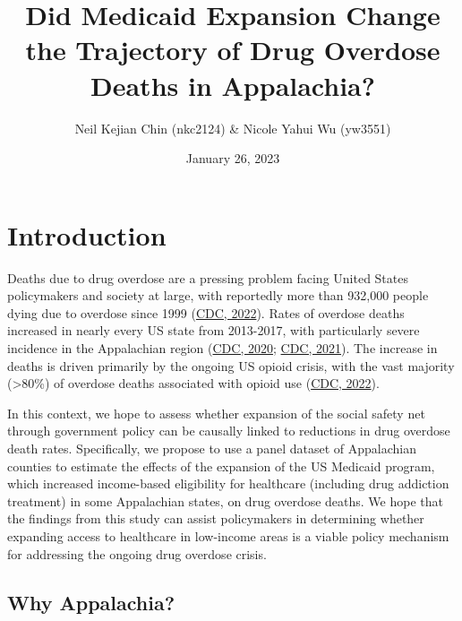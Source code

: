 \documentclass[
  11pt,
]{article}
\title{Did Medicaid Expansion Change the Trajectory of Drug Overdose
Deaths in Appalachia?}
\author{Neil Kejian Chin (nkc2124) \& Nicole Yahui Wu (yw3551)}
\date{January 26, 2023}
\begin{document}
\maketitle

\hypertarget{introduction}{%
\section{Introduction}\label{introduction}}

Deaths due to drug overdose are a pressing problem facing United States
policymakers and society at large, with reportedly more than 932,000
people dying due to overdose since 1999
(\href{https://www.cdc.gov/drugoverdose/deaths/index.html}{CDC, 2022}).
Rates of overdose deaths increased in nearly every US state from
2013-2017, with particularly severe incidence in the Appalachian region
(\href{https://www.cdc.gov/drugoverdose/deaths/2013-2017-increase.html}{CDC,
2020}; \href{https://www.cdc.gov/drugoverdose/deaths/2014.html}{CDC,
2021}). The increase in deaths is driven primarily by the ongoing US
opioid crisis, with the vast majority (\textgreater80\%) of overdose
deaths associated with opioid use
(\href{https://www.cdc.gov/drugoverdose/deaths/index.html}{CDC, 2022}).

In this context, we hope to assess whether expansion of the social
safety net through government policy can be causally linked to
reductions in drug overdose death rates. Specifically, we propose to use
a panel dataset of Appalachian counties to estimate the effects of the
expansion of the US Medicaid program, which increased income-based
eligibility for healthcare (including drug addiction treatment) in some
Appalachian states, on drug overdose deaths. We hope that the findings
from this study can assist policymakers in determining whether expanding
access to healthcare in low-income areas is a viable policy mechanism
for addressing the ongoing drug overdose crisis.

\hypertarget{why-appalachia}{%
\subsection{Why Appalachia?}\label{why-appalachia}}
\end{document}
